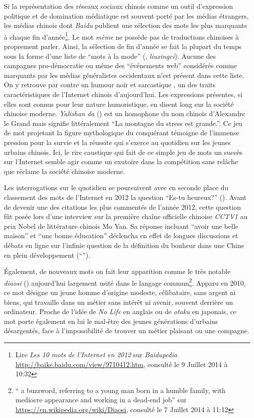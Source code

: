 Si la représentation des réseaux sociaux chinois comme un outil d'expression politique et de domination médiatique est souvent porté par les médias étrangers, les médias chinois dont \textit{Baidu} publient une sélection des mots les plus marquants à chaque fin d'année\footnote{Lire \textit{Les 10 mots de l'Internet en 2012} sur \textit{Baidupedia} \url{http://baike.baidu.com/view/9710412.htm}, consulté le 9 Juillet 2014 à 10:32}. Le mot \textit{mème} ne possède pas de traductions chinoises à proprement parler. Ainsi, la sélection de fin d'année se fait la plupart du temps sous la forme d'une liste de ``mots à la mode'' (, \textit{liuxingci}). Aucune des campagnes pro-démocratie ou même des ``événements web'' considérés comme marquants par les médias généralistes occidentaux n'est présent dans cette liste. On y retrouve par contre un humour noir et sarcastique , un des traits caractéristiques de l'Internet chinois d'aujourd'hui. Les expressions présentes, si elles sont connus pour leur nature humoristique, en disent long sur la société chinoise moderne. \textit{Yalishan da} () est un homophone du nom chinois d'Alexandre le Grand mais signifie littéralement ``La montagne du stress est grande.''. Ce jeu de mot projetant la figure mythologique du conquérant témoigne de l'immense pression pour la survie et la réussite qui s'exerce au quotidien sur les jeunes urbains chinois. Ici, le rire caustique qui fait de ce simple jeu de mots un succès sur l'Internet semble agir comme un exutoire dans la compétition sans relâche que réclame la société chinoise moderne. 

Les interrogations sur le quotidien se poursuivent avec en seconde place du classement des mots de l'Internet en 2012 la question ``Es-tu heureux?'' (). Avant de devenir une des citations les plus commentés de l'année 2012, cette question fût posée lors d'une interview sur la première chaîne officielle chinoise \textit{CCTV1} au prix Nobel de littérature chinois Mo Yan. Sa réponse incluant ``avoir une belle maison'' et ``une bonne éducation'' déclencha en effet de longues discussions et débats en ligne sur l'infinie question de la définition du bonheur dans une Chine en plein développement (``''). 

Également, de nouveaux mots on fait leur apparition comme le très notable \textit{diaosi} () aujourd'hui largement usité dans le langage commun\footnote{`` a buzzword, referring to a young man born in a humble family, with mediocre appearance and working in a dead-end job'' sur \url{https://en.wikipedia.org/wiki/Diaosi}, consulté le 7 Juillet 2014 à 11:12}. Apparu en 2010, ce mot désigne un jeune homme d'origine modeste, célibataire, sans argent ni biens, qui travaille dans un métier sans intérêt ni avenir, souvent derrière un ordinateur. Proche de l'idée de \textit{No Life} en anglais ou de \textit{otaku} en japonais, ce mot porte également en lui le mal-être des jeunes générations d'urbains désargentés, face à l'impossibilité de trouver un métier plaisant ou une compagne. 

